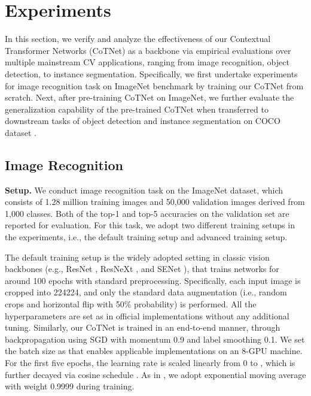 \documentclass[10pt,twocolumn,letterpaper]{article}
\begin{document}
\section{Experiments}
In this section, we verify and analyze the effectiveness of our Contextual Transformer Networks (CoTNet) as a backbone via empirical evaluations over multiple mainstream CV applications, ranging from image recognition, object detection, to instance segmentation. Specifically, we first undertake experiments for image recognition task on ImageNet benchmark \cite{deng2009imagenet} by training our CoTNet from scratch. Next, after pre-training CoTNet on ImageNet, we further evaluate the generalization capability of the pre-trained CoTNet when transferred to downstream tasks of object detection and instance segmentation on COCO dataset \cite{lin2014microsoft}.

\subsection{Image Recognition}

\textbf{Setup.} We conduct image recognition task on the ImageNet dataset, which consists of 1.28 million training images and 50,000 validation images derived from 1,000 classes. Both of the top-1 and top-5 accuracies on the validation set are reported for evaluation. For this task, we adopt two different training setups in the experiments, i.e., the default training setup and advanced training setup.

The default training setup is the widely adopted setting in classic vision backbones (e.g., ResNet \cite{he2016deep}, ResNeXt \cite{xie2017aggregated}, and SENet \cite{hu2018squeeze}), that trains networks for around 100 epochs with standard preprocessing. Specifically, each input image is cropped into 224224, and only the standard data augmentation (i.e., random crops and horizontal flip with 50\% probability) is performed. All the hyperparameters are set as in official implementations without any additional tuning. Similarly, our CoTNet is trained in an end-to-end manner, through backpropagation using SGD with momentum 0.9 and label smoothing 0.1. We set the batch size as  that enables applicable implementations on an 8-GPU machine. For the first five epochs, the learning rate is scaled linearly from 0 to , which is further decayed via cosine schedule \cite{loshchilov2016sgdr}. As in \cite{bello2021lambdanetworks}, we adopt exponential moving average with weight 0.9999 during training.
\end{document}
